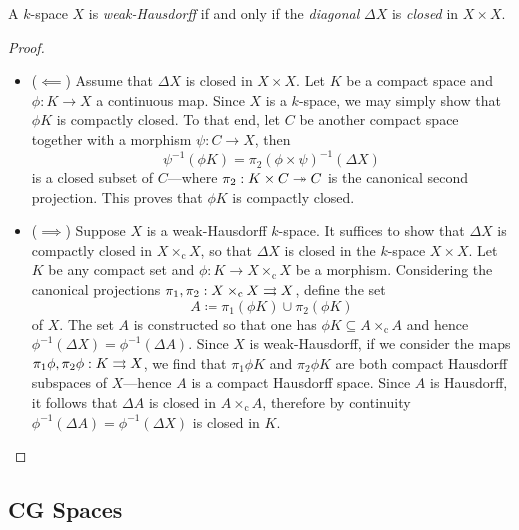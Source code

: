 \begin{proposition}
\label{prop:k-space-is-weak-hausdorff-iff-diagonal-closed}
A \(k\)-space \(X\) is \emph{weak-Hausdorff} if and only if the \emph{diagonal}
\(\Delta X\) is \emph{closed} in \(X \times X\).
\end{proposition}

\begin{proof}
\begin{itemize}\setlength\itemsep{0em}
\item (\(\impliedby\)) Assume that \(\Delta X\) is closed in \(X \times X\). Let
  \(K\) be a compact space and \(\phi: K \to X\) a continuous map. Since \(X\)
  is a \(k\)-space, we may simply show that \(\phi K\) is compactly closed. To
  that end, let \(C\) be another compact space together with a morphism
  \(\psi: C \to X\), then
  \[
  \psi^{-1}(\phi K) = \pi_2 (\phi \times \psi)^{-1}(\Delta X)
  \]
  is a closed subset of \(C\)---where \(\pi_2: K \times C \twoheadrightarrow C\) is the
  canonical second projection. This proves that \(\phi K\) is compactly closed.

\item (\(\implies\)) Suppose \(X\) is a weak-Hausdorff \(k\)-space. It suffices
  to show that \(\Delta X\) is compactly closed in \(X \times_{\text{c}} X\), so
  that \(\Delta X\) is closed in the \(k\)-space \(X \times X\). Let \(K\) be
  any compact set and \(\phi: K \to X \times_{\text{c}} X\) be a
  morphism. Considering the canonical projections
  \(\pi_1, \pi_2: X \times_{\text{c}} X \rightrightarrows X\), define the set
  \[
  A \coloneq \pi_1(\phi K) \cup \pi_2(\phi K)
  \]
  of \(X\). The set \(A\) is constructed so that one has
  \(\phi K \subseteq A \times_{\text{c}} A\) and hence
  \(\phi^{-1}(\Delta X) = \phi^{-1}(\Delta A)\). Since \(X\) is weak-Hausdorff,
  if we consider the maps \(\pi_1 \phi, \pi_2 \phi: K \rightrightarrows X\), we find that
  \(\pi_1\phi K\) and \(\pi_2 \phi K\) are both compact Hausdorff subspaces of
  \(X\)---hence \(A\) is a compact Hausdorff space. Since \(A\) is Hausdorff, it
  follows that \(\Delta A\) is closed in \(A \times_{\text{c}} A\), therefore by
  continuity \(\phi^{-1}(\Delta A) = \phi^{-1}(\Delta X)\) is closed in \(K\).
\end{itemize}
\end{proof}

\subsection{CG Spaces}

